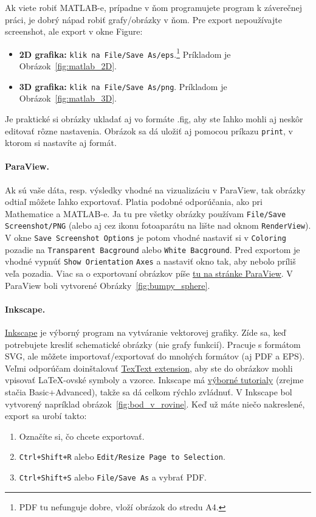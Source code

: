 Ak viete robiť MATLAB-e, prípadne v ňom programujete program k záverečnej práci, je dobrý nápad robiť grafy/obrázky v ňom. Pre export nepoužívajte screenshot, ale export v okne Figure:
\begin{itemize}
	\item \textbf{2D grafika:} \verb|klik na File/Save As/eps|.\footnote{PDF tu nefunguje dobre, vloží obrázok do stredu A4.} Príkladom je Obrázok~\ref{fig:matlab_2D}.
	\item \textbf{3D grafika:} \verb|klik na File/Save As/png|. Príkladom je Obrázok~\ref{fig:matlab_3D}.
\end{itemize}
Je praktické si obrázky ukladať aj vo formáte .fig, aby ste ľahko mohli aj neskôr editovať rôzne nastavenia. Obrázok sa dá uložiť aj pomocou príkazu \verb|print|, v ktorom si nastavíte aj formát.


\paragraph{ParaView.}

Ak sú vaše dáta, resp. výsledky vhodné na vizualizáciu v ParaView, tak obrázky odtiaľ môžete ľahko exportovať. Platia podobné odporúčania, ako pri Mathematice a MATLAB-e. Ja tu pre všetky obrázky používam \verb|File/Save Screenshot/PNG| (alebo aj cez ikonu fotoaparátu na lište nad oknom \verb|RenderView|). V okne \verb|Save Screenshot Options| je potom vhodné nastaviť si v \verb|Coloring| pozadie na \verb|Transparent Bacground| alebo \verb|White Bacground|. Pred exportom je vhodné vypnúť \verb|Show Orientation| \verb|Axes| a nastaviť okno tak, aby nebolo príliš veľa pozadia. 
Viac sa o exportovaní obrázkov píše \href{https://docs.paraview.org/en/v5.8/UsersGuide/savingResults.html}{tu na stránke ParaView}. V ParaView boli vytvorené Obrázky~\ref{fig:bumpy_sphere}.


\paragraph{Inkscape.}

\href{https://inkscape.org/}{Inkscape} je výborný program na vytváranie vektorovej grafiky. Zíde sa, keď potrebujete kresliť schematické obrázky (nie grafy funkcií). Pracuje s formátom SVG, ale môžete importovať/exportovať do mnohých formátov (aj PDF a EPS). Veľmi odporúčam doinštalovať \href{https://inkscape.org/~jcwinkler/%E2%98%85textext}{TexText extension}, aby ste do obrázkov mohli vpisovať LaTeX-ovské symboly a vzorce. Inkscape má \href{https://inkscape.org/learn/}{výborné tutorialy} (zrejme stačia Basic+Advanced), takže sa dá celkom rýchlo zvládnuť. V Inkscape bol vytvorený napríklad obrázok~\ref{fig:bod_v_rovine}. Keď už máte niečo nakreslené, export sa urobí takto:
\begin{enumerate}
	\item Označíte si, čo chcete exportovať.
	\item \verb|Ctrl+Shift+R| alebo \verb|Edit/Resize Page to Selection|.
	\item \verb|Ctrl+Shift+S| alebo \verb|File/Save As| a vybrať PDF. 
\end{enumerate}

